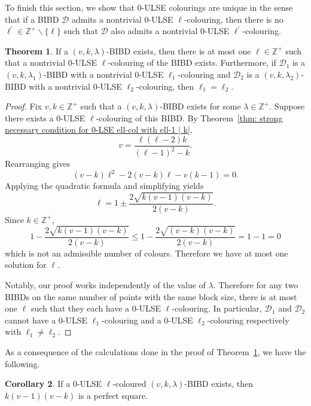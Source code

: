 \documentclass[12pt]{article}
\theoremstyle{definition}
\newtheorem{theorem}{Theorem}[section]
\newtheorem{corollary}[theorem]{Corollary}
\begin{document}
To finish this section, we show that $0$-ULSE colourings are unique in the sense that if a BIBD $\mathcal{D}$ admits a nontrivial $0$-ULSE $\ell$-colouring, then there is no $\ell^\prime \in \mathbb{Z}^+\backslash\{\ell\}$ such that $\mathcal{D}$ also admits a nontrivial $0$-ULSE $\ell^\prime$-colouring. 

\begin{theorem}\label{thm: uniqueness}
    If a $(v,k,\lambda)$-BIBD exists, then there is at most one $\ell\in \mathbb{Z}^+$ such that a nontrivial $0$-ULSE $\ell$-colouring of the BIBD exists. Furthermore, if $\mathcal{D}_1$ is a $(v,k,\lambda_1)$-BIBD with a nontrivial $0$-ULSE $\ell_1$-colouring and $\mathcal{D}_2$ is a $(v,k,\lambda_2)$-BIBD with a nontrivial $0$-ULSE $\ell_2$-colouring, then $\ell_1 = \ell_2$. 
\end{theorem}

\begin{proof}
    Fix $v,k\in \mathbb{Z}^+$ such that a $(v,k,\lambda)$-BIBD exists for some $\lambda\in \mathbb{Z}^+$. Suppose there exists a $0$-ULSE $\ell$-colouring of this BIBD. By Theorem~\ref{thm: strong necessary condition for 0-LSE ell-col with ell-1 | k}, \[v = \frac{\ell(\ell-2)k}{(\ell-1)^2 - k}.\] Rearranging gives \[(v-k)\ell^2 - 2(v-k)\ell - v(k-1) = 0.\] Applying the quadratic formula and simplifying yields 
    \begin{equation}\label{eq: ell in terms of vk}
        \ell = 1\pm \frac{2\sqrt{k(v-1)(v-k)}}{2(v-k)}.
    \end{equation}
    Since $k\in \mathbb{Z}^+$, \[1 - \frac{2\sqrt{k(v-1)(v-k)}}{2(v-k)} \leq 1 - \frac{2\sqrt{(v-k)(v-k)}}{2(v-k)} = 1-1 = 0\] which is not an admissible number of colours. Therefore we have at most one solution for $\ell$.

    Notably, our proof works independently of the value of $\lambda$. Therefore for any two BIBDs on the same number of points with the same block size, there is at most one $\ell$ such that they each have a $0$-ULSE $\ell$-colouring. In particular, $\mathcal{D}_1$ and $\mathcal{D}_2$ cannot have a $0$-ULSE $\ell_1$-colouring and a $0$-ULSE $\ell_2$-colouring respectively with $\ell_1 \neq \ell_2$. 
\end{proof}

As a consequence of the calculations done in the proof of Theorem~\ref{thm: uniqueness}, we have the following.

\begin{corollary}
    If a $0$-ULSE $\ell$-coloured $(v,k,\lambda)$-BIBD exists, then $k(v-1)(v-k)$ is a perfect square.
\end{corollary}
\end{document}
